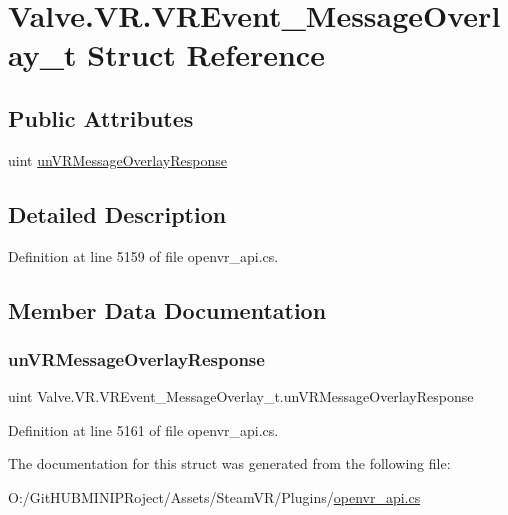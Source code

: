 \hypertarget{struct_valve_1_1_v_r_1_1_v_r_event___message_overlay__t}{}\section{Valve.\+V\+R.\+V\+R\+Event\+\_\+\+Message\+Overlay\+\_\+t Struct Reference}
\label{struct_valve_1_1_v_r_1_1_v_r_event___message_overlay__t}
\subsection*{Public Attributes}
\begin{DoxyCompactItemize}
\item 
uint \mbox{\hyperlink{struct_valve_1_1_v_r_1_1_v_r_event___message_overlay__t_a63b533ad7ac33a2a9fbf2dd3c3a48a21}{un\+V\+R\+Message\+Overlay\+Response}}
\end{DoxyCompactItemize}


\subsection{Detailed Description}


Definition at line 5159 of file openvr\+\_\+api.\+cs.



\subsection{Member Data Documentation}
\mbox{\label{struct_valve_1_1_v_r_1_1_v_r_event___message_overlay__t_a63b533ad7ac33a2a9fbf2dd3c3a48a21}} 
\subsubsection{\texorpdfstring{unVRMessageOverlayResponse}{unVRMessageOverlayResponse}}
{\footnotesize\ttfamily uint Valve.\+V\+R.\+V\+R\+Event\+\_\+\+Message\+Overlay\+\_\+t.\+un\+V\+R\+Message\+Overlay\+Response}



Definition at line 5161 of file openvr\+\_\+api.\+cs.



The documentation for this struct was generated from the following file\+:\begin{DoxyCompactItemize}
\item 
O\+:/\+Git\+H\+U\+B\+M\+I\+N\+I\+P\+Roject/\+Assets/\+Steam\+V\+R/\+Plugins/\mbox{\hyperlink{openvr__api_8cs}{openvr\+\_\+api.\+cs}}\end{DoxyCompactItemize}
